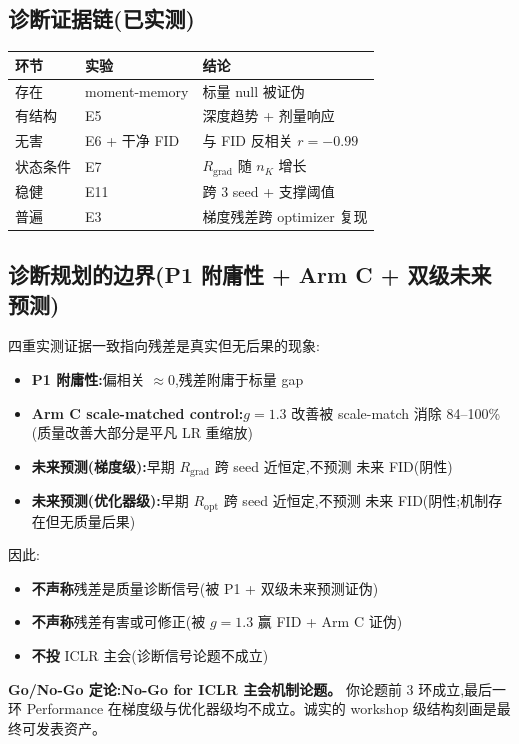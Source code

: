\documentclass[UTF8,11pt,a4paper]{ctexart}
\begin{document}
\subsection{诊断证据链(已实测)}
\begin{center}
\begin{tabular}{@{}lll@{}}
\toprule
环节 & 实验 & 结论 \\
\midrule
存在 & moment-memory & 标量 null 被证伪 \\
有结构 & E5 & 深度趋势 + 剂量响应 \\
无害 & E6 + 干净 FID & 与 FID 反相关 $r{=}{-}0.99$ \\
状态条件 & E7 & $R_{\mathrm{grad}}$ 随 $n_K$ 增长 \\
稳健 & E11 & 跨 3 seed + 支撑阈值 \\
普遍 & E3 & 梯度残差跨 optimizer 复现 \\
\bottomrule
\end{tabular}
\end{center}

\subsection{诊断规划的边界(P1 附庸性 + Arm C + 双级未来预测)}
四重实测证据一致指向残差是真实但无后果的现象:
\begin{itemize}
  \item \textbf{P1 附庸性:}偏相关 $\approx 0$,残差附庸于标量 gap
  \item \textbf{Arm C scale-matched control:}$g{=}1.3$ 改善被 scale-match 消除
        84--100\%(质量改善大部分是平凡 LR 重缩放)
  \item \textbf{未来预测(梯度级):}早期 $R_{\mathrm{grad}}$ 跨 seed 近恒定,不预测
        未来 FID(阴性)
  \item \textbf{未来预测(优化器级):}早期 $R_{\mathrm{opt}}$ 跨 seed 近恒定,不预测
        未来 FID(阴性;机制存在但无质量后果)
\end{itemize}
因此:
\begin{itemize}
  \item \textbf{不声称}残差是质量诊断信号(被 P1 + 双级未来预测证伪)
  \item \textbf{不声称}残差有害或可修正(被 $g{=}1.3$ 赢 FID + Arm C 证伪)
  \item \textbf{不投} ICLR 主会(诊断信号论题不成立)
\end{itemize}
\textbf{Go/No-Go 定论:No-Go for ICLR 主会机制论题。} 你论题前 3 环成立,最后一环
Performance 在梯度级与优化器级均不成立。诚实的 workshop 级结构刻画是最终可发表资产。
\end{document}
